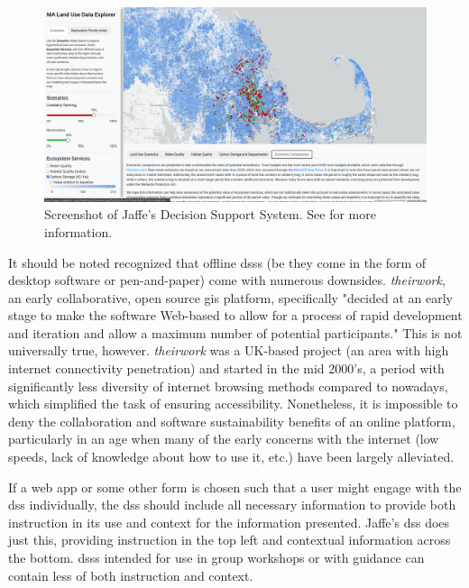 \begin{figure}[!htb]
	\centering
	\includegraphics[scale=0.2]{Figures/chap3/jaffe_application.png}
	\caption[Screenshot of Jaffe's Decision Support System] {Screenshot of Jaffe's Decision Support System. See \cite{jaffeEnvironmentalEconomicSystems2022} for more information.}
	\label{fig:jaffe_application}
\end{figure}

It should be noted recognized that offline \acp{dss} (be they come in the form of desktop software or pen-and-paper) come with numerous downsides. \textit{theirwork}, an early collaborative, open source \ac{gis} platform, specifically "decided at an early stage to make the software Web-based to allow for a process of rapid development and iteration and allow a maximum number of potential participants." \cite{williamsonTheirworkDevelopmentSustainable2011} This is not universally true, however. \textit{theirwork} was a UK-based project (an area with high internet connectivity penetration) and started in the mid 2000's, a period with significantly less diversity of internet browsing methods compared to nowadays, which simplified the task of ensuring accessibility. Nonetheless, it is impossible to deny the collaboration and software sustainability benefits of an online platform, particularly in an age when many of the early concerns with the internet (low speeds, lack of knowledge about how to use it, etc.) \cite{shifterInteractiveMultimediaPlanning1995} have been largely alleviated.

If a web app or some other form is chosen such that a user might engage with the \ac{dss} individually, the \ac{dss} should include all necessary information to provide both instruction in its use and context for the information presented. Jaffe's \ac{dss} does just this, providing instruction in the top left and contextual information across the bottom. \acp{dss} intended for use in group workshops or with guidance can contain less of both instruction and context.

